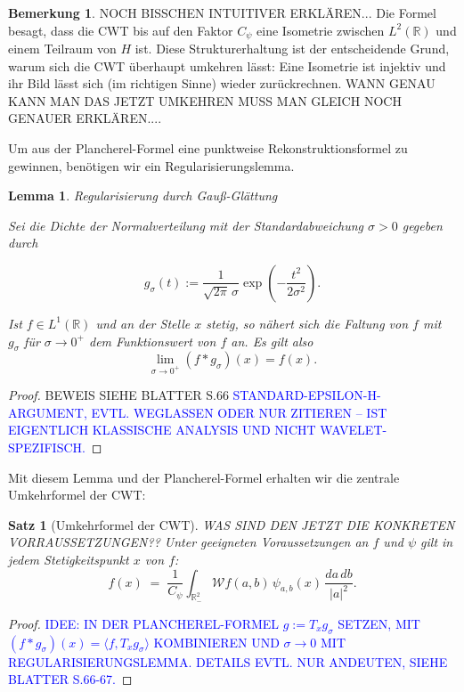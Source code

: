 \documentclass[a4paper,11pt,bibliography=totoc,listof=totoc,headinclude=true,cleardoublepage=empty,oneside]{scrbook}
\newtheorem{lemma}[theorem]{Lemma}
\newtheorem{satz}[theorem]{Satz}
\theoremstyle{definition}
\newtheorem{bemerkung}[theorem]{Bemerkung}
\theoremstyle{remark}
\begin{document}
  \begin{bemerkung} NOCH BISSCHEN INTUITIVER ERKLÄREN...
   Die Formel besagt, dass die CWT bis auf den Faktor $C_\psi$ eine Isometrie
   zwischen $L^2(\mathbb{R})$ und einem Teilraum von $H$ ist. Diese Strukturerhaltung
   ist der entscheidende Grund, warum sich die CWT überhaupt umkehren lässt: Eine
   Isometrie ist injektiv und ihr Bild lässt sich (im richtigen Sinne) wieder
   zurückrechnen. WANN GENAU KANN MAN DAS JETZT UMKEHREN MUSS MAN GLEICH NOCH GENAUER ERKLÄREN....
  \end{bemerkung}

  Um aus der Plancherel-Formel eine punktweise Rekonstruktionsformel zu gewinnen,
  benötigen wir ein Regularisierungslemma.
 
  \begin{lemma}{Regularisierung durch Gauß-Glättung} \cite[S.~66, Section~3.3]{blatterWaveletsEinfuhrung2003}

   Sei die Dichte der Normalverteilung mit der Standardabweichung $\sigma > 0$ gegeben durch 

   \[
   g_\sigma(t)
   :=
   \frac{1}{\sqrt{2\pi}\,\sigma}
   \exp\!\left(-\frac{t^2}{2\sigma^2}\right).
   \]
   
   Ist $f \in L^1(\mathbb{R})$ und an der Stelle $x$ stetig, so nähert sich die Faltung von
   $f$ mit $g_\sigma$ für $\sigma \to 0^+$ dem Funktionswert von $f$ an. 
   Es gilt also   
   \[
   \lim_{\sigma \to 0^+} (f * g_\sigma)(x) = f(x).
   \]

  \end{lemma}  

  \begin{proof}
   BEWEIS SIEHE BLATTER S.66
   \textcolor{blue}{STANDARD-EPSILON-H-ARGUMENT, EVTL. WEGLASSEN ODER NUR ZITIEREN -- IST
   EIGENTLICH KLASSISCHE ANALYSIS UND NICHT WAVELET-SPEZIFISCH.}
  \end{proof}

  Mit diesem Lemma und der Plancherel-Formel erhalten wir die zentrale
  Umkehrformel der CWT:

  \begin{satz}[Umkehrformel der CWT] WAS SIND DEN JETZT DIE KONKRETEN VORRAUSSETZUNGEN??
   Unter geeigneten Voraussetzungen an $f$ und $\psi$ gilt in jedem Stetigkeitspunkt 
   $x$ von $f$:
   \[
     f(x) \;=\; \frac{1}{C_\psi} \int_{\mathbb{R}^2_-} \mathcal{W}f(a,b)\,
     \psi_{a,b}(x) \, \frac{da\,db}{|a|^2} .
   \]
  \end{satz}
   
  \begin{proof}
   \textcolor{blue}{IDEE: IN DER PLANCHEREL-FORMEL $g := T_x g_\sigma$ SETZEN, MIT
   $(f * g_\sigma)(x) = \langle f, T_x g_\sigma\rangle$ KOMBINIEREN UND
   $\sigma \to 0$ MIT REGULARISIERUNGSLEMMA. DETAILS EVTL. NUR ANDEUTEN, SIEHE
   BLATTER S.66-67.}
  \end{proof}
\end{document}
